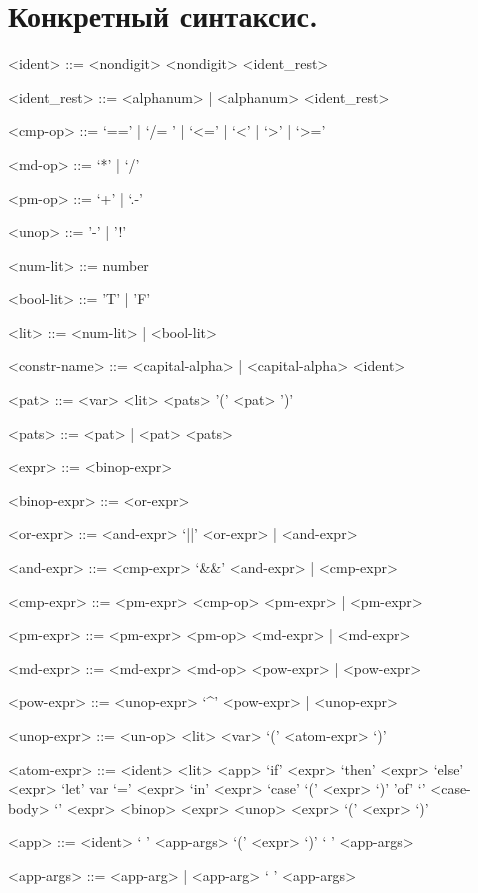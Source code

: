 \documentclass[12pt, a4paper] {ncc}
\begin{document}
\setcounter{figure}{0}

\section{Конкретный синтаксис.}
\begin{grammar}
<ident> ::= <nondigit>
\alt <nondigit> <ident_rest>

<ident_rest> ::= <alphanum> | <alphanum> <ident_rest>

<cmp-op> ::= `==' | `/= ' | `<=' | `<' | `>' | `>=' 

<md-op> ::= `*' | `/' 

<pm-op> ::= `+' | `.-' 

<unop> ::= '-' | '!'

<num-lit> ::= number

<bool-lit> ::= 'T' | 'F'

<lit> ::= <num-lit> | <bool-lit>

<constr-name> ::= <capital-alpha> | <capital-alpha> <ident>

<pat> ::= <var>
\alt <lit>
 <pats>
\alt '(' <pat> ')'

<pats> ::= <pat> | <pat> <pats>

<expr> ::= <binop-expr>

<binop-expr> ::= <or-expr>

<or-expr> ::= <and-expr> `||' <or-expr> | <and-expr>

<and-expr> ::= <cmp-expr> `&&' <and-expr> | <cmp-expr>

<cmp-expr> ::= <pm-expr> <cmp-op> <pm-expr> | <pm-expr>

<pm-expr> ::= <pm-expr> <pm-op> <md-expr> | <md-expr>

<md-expr> ::= <md-expr> <md-op> <pow-expr> | <pow-expr>

<pow-expr> ::= <unop-expr> `^' <pow-expr> | <unop-expr>

<unop-expr> ::= <un-op> <lit>
 <var>
 `(' <atom-expr> `)'

<atom-expr> ::= <ident>
\alt <lit>
\alt <app>
\alt `if' <expr> `then' <expr> `else' <expr>
\alt `let' var `=' <expr> `in' <expr>
\alt `case' `(' <expr> `)' 'of' `{' <case-body> `}'
\alt  <expr> <binop> <expr>
\alt <unop> <expr>
\alt `(' <expr> `)'

<app> ::= <ident> ` ' <app-args>
\alt `(' <expr> `)' ` ' <app-args>

<app-args> ::= <app-arg> | <app-arg> ` ' <app-args>


\end{grammar}
\end{document}
